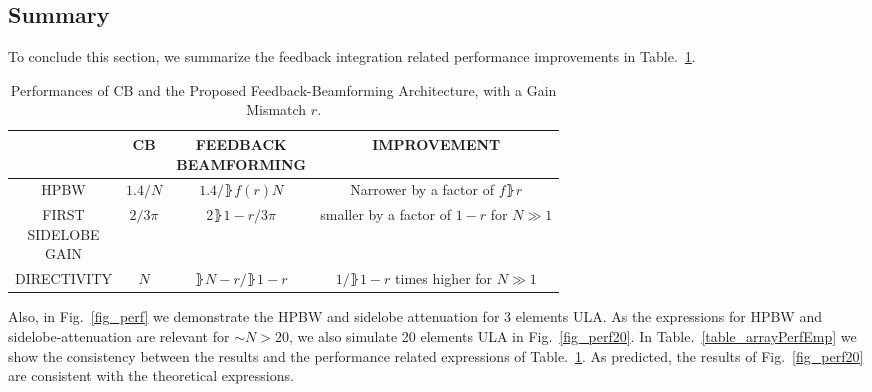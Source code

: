 \subsection{Summary}
To conclude this section, we summarize the feedback integration related performance improvements in Table.~\ref{table_arrayPerformance}.
\begin{table}[h!]
    \caption{Performances of CB and the Proposed Feedback-Beamforming Architecture, with a Gain Mismatch $r$.}
    \centering
    {
        \begin{tabular}{||c c c c||}
            \hline
            & CB & \thead{FEEDBACK\\BEAMFORMING} & IMPROVEMENT \\ [0.5ex] 
            \hline\hline
            HPBW & $ 1.4/N$ & $1.4/\rBrace{f(r)N}$ & Narrower by a factor of $f\rBrace{r}$\\ 
            \thead{FIRST\\SIDELOBE\\GAIN} & $2/3\pi$ & $2\rBrace{1-r}/3\pi$ & \thead{smaller by a factor of $1-r$\\for $N\gg{}1$} \\
            DIRECTIVITY & $N$ & $\rBrace{N-r}/\rBrace{1-r}$ & \thead{$1/\rBrace{1-r}$ times higher \\ for $N\gg{}1$}\\
            [1ex] 
            \hline
         \end{tabular}
     }
    \label{table_arrayPerformance}
\end{table}
Also, in Fig.~\ref{fig_perf} we demonstrate the HPBW and sidelobe attenuation for 3 elements ULA.
As the expressions for HPBW and sidelobe-attenuation are relevant for $\sim{}N>20$, we also simulate 20 elements ULA in Fig.~\ref{fig_perf20}. 
In Table.~\ref{table_arrayPerfEmp} we show the consistency between the results and the performance related expressions of Table.~\ref{table_arrayPerformance}.
As predicted, the results of Fig.~\ref{fig_perf20} are consistent with the theoretical expressions.
